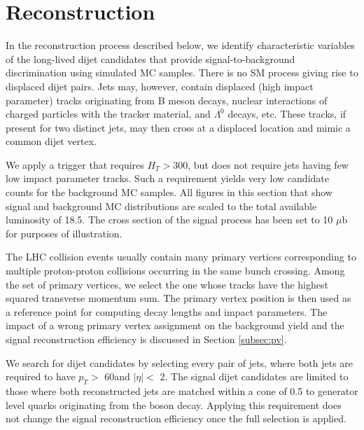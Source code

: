 
\section{Reconstruction}

In the reconstruction process described below, we identify characteristic variables
of the long-lived dijet candidates that provide
signal-to-background discrimination using simulated MC samples.    
There is no SM process giving rise to displaced dijet pairs. Jets may,
however, contain displaced (high impact parameter) tracks originating from B meson decays, nuclear
interactions of charged particles with the tracker material, \Kshort and $\Lambda^0$ decays, etc. These tracks, if 
present for two distinct jets,
may then cross at a displaced location and mimic a common dijet vertex. 

We apply a trigger that requires $H_T>$300\GeV, but does not require
jets having few low impact parameter tracks. Such a requirement
yields very low
candidate counts for the background MC samples.
All figures in this section that show signal and background MC distributions 
are scaled to the total available luminosity
of 18.5\fbinv. 
The cross section of the signal process has been set to 10 $\mu$b for purposes of illustration.   

The LHC collision events usually contain many primary vertices corresponding to multiple proton-proton collisions occurring 
in the same bunch crossing.
Among the set of primary vertices, we select the one whose tracks have the highest squared transverse momentum sum.
 The primary vertex position is
then used as a reference point for computing decay lengths and impact parameters. The impact of a wrong
primary vertex assignment on the background yield and the signal reconstruction efficiency is discussed
in Section \ref{subsec:pv}. 


We search for dijet candidates by selecting every pair of jets, where both jets are required
to have $p_T>$ 60\GeV and $|\eta|<$ 2. 
The signal dijet candidates are limited
to those where both reconstructed jets are matched within a cone of 0.5 to generator level quarks originating
 from the \X boson decay. Applying this requirement does not change the signal reconstruction efficiency
once the full selection is applied. 


